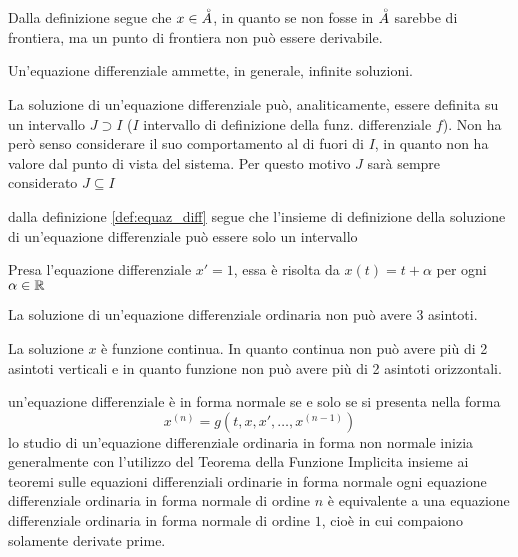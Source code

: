 \begin{note} \hypertarget{def:equaz_diff_sol}{}
	Dalla definizione segue che $x \in \accentset{\circ}{A}$, in quanto se non fosse in $\accentset{\circ}{A}$ sarebbe di frontiera, ma un punto di frontiera non può essere derivabile.
\end{note}
\begin{note}
	Un'equazione differenziale ammette, in generale, infinite soluzioni.
\end{note}
\begin{note} \hypertarget{note:diff_eq_sol_definit_set}{}
	La soluzione di un'equazione differenziale può, analiticamente, essere definita su un intervallo $J\supset I$ ($I$ intervallo di definizione della funz. differenziale $f$). Non ha però senso considerare il suo comportamento al di fuori di $I$, in quanto non ha valore dal punto di vista del sistema. Per questo motivo $J$ sarà sempre considerato $J\subseteq I$
\end{note}
\begin{note}
	dalla definizione \ref{def:equaz_diff} segue che l'insieme di definizione della soluzione di un'equazione differenziale può essere solo un intervallo
\end{note}
\begin{example}
	Presa l'equazione differenziale $ x'=1$, essa è risolta da $x(t) = t + \alpha$ per ogni $\alpha\in\mathbb{R}$
\end{example}
\begin{exercise}
	La soluzione di un'equazione differenziale ordinaria non può avere 3 asintoti.
	\begin{solution}
		La soluzione $x$ è funzione continua. In quanto continua non può avere più di 2 asintoti verticali e in quanto funzione non può avere più di 2 asintoti orizzontali.
	\end{solution}
\end{exercise}
un'equazione differenziale è in forma normale  se e solo se si presenta nella forma 
$$x^{(n)} = g(t,x, x',\ldots,x^{(n-1)})$$
\observation
lo studio di un'equazione differenziale ordinaria in forma non normale inizia generalmente con l'utilizzo del Teorema della Funzione Implicita insieme ai teoremi sulle equazioni differenziali ordinarie in forma normale
\proposition\label{prop:equaz_n_equival_1}
ogni equazione differenziale ordinaria in forma normale di ordine $n$ è equivalente a una equazione differenziale ordinaria in forma normale di ordine $1$, cioè in cui compaiono solamente derivate prime.
